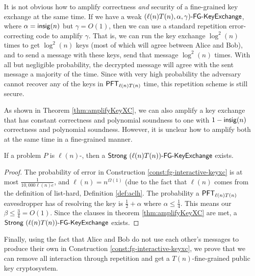 \begin{remark} It is not obvious how to amplify correctness \emph{and} security of a fine-grained key exchange at the same time. If we have a weak $(\ell(n)T(n), \alpha, \gamma)\textsf{-FG-KeyExchange}$, where $\alpha = \mathsf{insig}(n)$ but $\gamma = O(1)$, then we can use a standard repetition error-correcting code to amplify $\gamma$. That is, we can run the key exchange $\log^2(n)$ times to get $\log^2(n)$ keys (most of which will agree between Alice and Bob), and to send a message with these keys, send that message $\log^2(n)$ times. With all but negligible probability, the decrypted message will agree with the sent message a majority of the time.
Since with very high probability the adversary cannot recover any of the keys in $\mathsf{PFT}_{\ell(n)T(n)}$ time, this repetition scheme is still secure.

As shown in Theorem \ref{thm:amplifyKeyXC}, we can also amplify a key exchange that has constant correctness and polynomial soundness to one with $1 - \mathsf{insig}(n)$ correctness and polynomial soundness. However, it is unclear how to amplify both at the same time in a fine-grained manner.
\end{remark}

\begin{corollary}\label{cor:strongFGKeyXc}
	If a problem $P$ is $\ell(n)$-\keyER, then a $\textsf{Strong } (\ell(n)T(n))\textsf{-FG-KeyExchange}$ exists.
\end{corollary}
\begin{proof}
	The probability of error in Construction \ref{const:fg-interactive-keyxc} is at most $\frac{1}{10,000 \ell(n) e}$, and $\ell(n) = n^{\Omega(1)}$ (due to the fact that $\ell(n)$ comes from the definition of list-hard, Definition \ref{def:aclh}. The probability a $\mathsf{PFT}_{\ell(n)T(n)}$ eavesdropper has of resolving the key is $\frac 1 2 + \alpha$ where $\alpha\leq \frac 1 4$. This means our $\beta \leq \frac 3 4 = O(1)$. Since the clauses in theorem \ref{thm:amplifyKeyXC} are met, a $\textsf{Strong } (\ell(n)T(n))\textsf{-FG-KeyExchange}$ exists.
\end{proof}

Finally, using the fact that Alice and Bob do not use each other's messages to produce their own in Construction \ref{const:fg-interactive-keyxc}, we prove that we can remove all interaction through repetition and get a $T(n)$-fine-grained public key cryptosystem.


